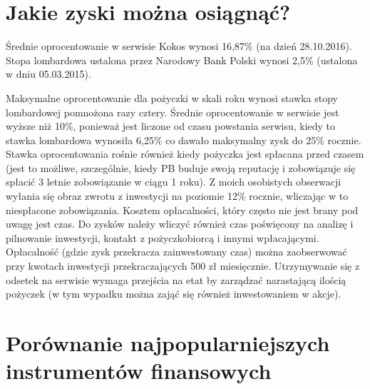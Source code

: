 \documentclass[a4paper,twoside,titlepage,openright]{book}
\begin{document}
\section{Jakie zyski można osiągnąć?}

Średnie oprocentowanie w serwisie Kokos wynosi 16,87\% \cite{zostanInwestorem} (na dzień 28.10.2016).
Stopa lombardowa ustalona przez Narodowy Bank Polski wynosi 2,5\% \cite{stopy} (ustalona w dniu 05.03.2015).

Maksymalne oprocentowanie dla pożyczki w skali roku wynosi stawka stopy lombardowej pomnożona razy cztery. Średnie oprocentowanie w serwisie jest wyższe niż 10\%, ponieważ jest liczone od czasu powstania serwisu, kiedy to stawka lombardowa wynosiła 6,25\% co dawało maksymalny zysk do 25\% rocznie. Stawka oprocentowania rośnie również kiedy pożyczka jest spłacana przed czasem (jest to możliwe, szczególnie, kiedy PB buduje swoją reputację i zobowiązuje się spłacić 3 letnie zobowiązanie w ciągu 1 roku). Z moich osobistych obserwacji wyłania się obraz zwrotu z inwestycji na poziomie 12\% rocznie, wliczając w to niespłacone zobowiązania. Kosztem opłacalności, który często nie jest brany pod uwagę jest czas. Do zysków należy wliczyć również czas poświęcony na analizę i pilnowanie inwestycji, kontakt z pożyczkobiorcą i innymi wpłacającymi. Opłacalność (gdzie zysk przekracza zainwestowany czas) można zaobserwować przy kwotach inwestycji przekraczających 500 zł miesięcznie. Utrzymywanie się z odsetek na serwisie wymaga przejścia na etat by zarządzać narastającą ilością pożyczek (w tym wypadku można zająć się również inwestowaniem w akcje).


\section{Porównanie najpopularniejszych instrumentów finansowych}

\end{document}
